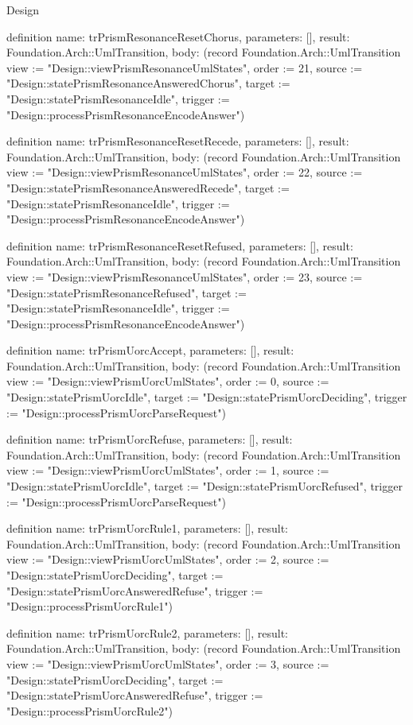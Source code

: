 \begin{lexlean}{Design}
\begin{semanticmodule}
definition{
  name: trPrismResonanceResetChorus,
  parameters: [],
  result: Foundation.Arch::UmlTransition,
  body: (record Foundation.Arch::UmlTransition {view := "Design::viewPrismResonanceUmlStates", order := 21, source := "Design::statePrismResonanceAnsweredChorus", target := "Design::statePrismResonanceIdle", trigger := "Design::processPrismResonanceEncodeAnswer"})
}

definition{
  name: trPrismResonanceResetRecede,
  parameters: [],
  result: Foundation.Arch::UmlTransition,
  body: (record Foundation.Arch::UmlTransition {view := "Design::viewPrismResonanceUmlStates", order := 22, source := "Design::statePrismResonanceAnsweredRecede", target := "Design::statePrismResonanceIdle", trigger := "Design::processPrismResonanceEncodeAnswer"})
}

definition{
  name: trPrismResonanceResetRefused,
  parameters: [],
  result: Foundation.Arch::UmlTransition,
  body: (record Foundation.Arch::UmlTransition {view := "Design::viewPrismResonanceUmlStates", order := 23, source := "Design::statePrismResonanceRefused", target := "Design::statePrismResonanceIdle", trigger := "Design::processPrismResonanceEncodeAnswer"})
}

definition{
  name: trPrismUorcAccept,
  parameters: [],
  result: Foundation.Arch::UmlTransition,
  body: (record Foundation.Arch::UmlTransition {view := "Design::viewPrismUorcUmlStates", order := 0, source := "Design::statePrismUorcIdle", target := "Design::statePrismUorcDeciding", trigger := "Design::processPrismUorcParseRequest"})
}

definition{
  name: trPrismUorcRefuse,
  parameters: [],
  result: Foundation.Arch::UmlTransition,
  body: (record Foundation.Arch::UmlTransition {view := "Design::viewPrismUorcUmlStates", order := 1, source := "Design::statePrismUorcIdle", target := "Design::statePrismUorcRefused", trigger := "Design::processPrismUorcParseRequest"})
}

definition{
  name: trPrismUorcRule1,
  parameters: [],
  result: Foundation.Arch::UmlTransition,
  body: (record Foundation.Arch::UmlTransition {view := "Design::viewPrismUorcUmlStates", order := 2, source := "Design::statePrismUorcDeciding", target := "Design::statePrismUorcAnsweredRefuse", trigger := "Design::processPrismUorcRule1"})
}

definition{
  name: trPrismUorcRule2,
  parameters: [],
  result: Foundation.Arch::UmlTransition,
  body: (record Foundation.Arch::UmlTransition {view := "Design::viewPrismUorcUmlStates", order := 3, source := "Design::statePrismUorcDeciding", target := "Design::statePrismUorcAnsweredRefuse", trigger := "Design::processPrismUorcRule2"})
}


\end{semanticmodule}
\end{lexlean}

